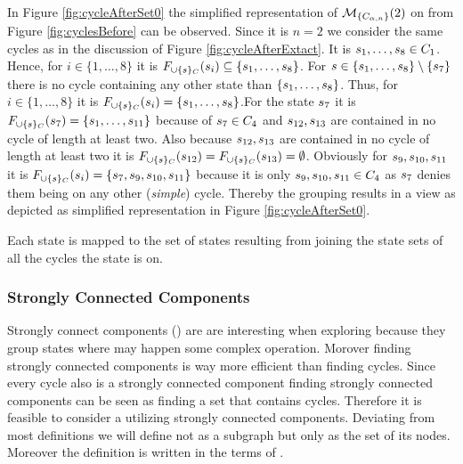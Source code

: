 \documentclass[preview]{standalone}
\begin{document}
In Figure \ref{fig:cycleAfterSet0} the simplified representation of ${{{{{\mathcal{M}}}}_{{\{{C}_{{\alpha},n}\}}}}}(2)$ on \chgph from Figure \ref{fig:cyclesBefore} can be observed. Since it is $n=2$ we consider the same cycles as in the discussion of Figure \ref{fig:cycleAfterExtact}. It is ${s}_1, \dots, {s}_8 \in {C}_1$. Hence, for $i \in \{1, \dots, 8\}$ it is $\gfctcycleset(\state_i) \subseteq \{\state_1, \dots, \state_8\}$. For ${s} \in \{{s}_1, \dots, {s}_8\} \setminus \{{s}_7\}$ there is no cycle containing any other state than $\{{s}_1, \dots, {s}_8\}$. Thus, for $i \in \{1, \dots, 8\}$ it is $\gfctcycleset(\state_i) = \{\state_1, \dots, \state_8\}$.For the state ${s}_7$ it is $\gfctcycleset(\state_7) = \{\state_1, \dots, \state_{11}\}$ because of ${s}_7 \in {C}_4$ and ${s}_{12}, {s}_{13}$ are contained in no cycle of length at least two. Also because ${s}_{12}, {s}_{13}$ are contained in no cycle of length at least two it is $\gfctcycleset(\state_{12}) = \gfctcycleset(\state_{13}) = \emptyset$. Obviously for ${s}_9, {s}_{10}, {s}_{11}$ it is $\gfctcycleset(\state_i) = \{\state_7, \state_9, \state_{10}, \state_{11}\}$ because it is only ${s}_9, {s}_{10}, {s}_{11} \in {C}_4$ as ${s}_7$ denies them being on any other (\emph{simple}) cycle. Thereby the grouping results in a view as depicted as simplified representation in Figure \ref{fig:cycleAfterSet0}.


Each state is mapped to the set of states resulting from joining the state sets of all the cycles the state is on. 

\subsubsection{Strongly Connected Components}
Strongly connect components (\sccN) are are interesting when exploring \achgphN because they group states where may happen some complex operation. Morover finding strongly connected components is way more efficient than finding cycles. Since every cycle also is a strongly connected component finding strongly connected components can be seen as finding a set that contains cycles. Therefore it is feasible to consider a \viewN utilizing strongly connected components. Deviating from most definitions we will define \sccN not as a subgraph but only as the set of its nodes. Moreover the definition is written in the terms of \achgphN.
\end{document}
